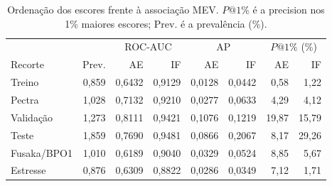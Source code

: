 \begin{table}[htbp]
\centering\small
\caption{Ordenação dos escores frente à associação MEV. $P@1\%$ é a precision nos 1\% maiores escores; Prev. é a prevalência (\%).}
\label{tab:associacao}
\begin{tabular}{@{}lrrrrrrr@{}}
\toprule
 & & \multicolumn{2}{c}{ROC-AUC} & \multicolumn{2}{c}{AP} & \multicolumn{2}{c}{$P@1\%$ (\%)} \\ Recorte & Prev. & AE & IF & AE & IF & AE & IF \\
\midrule
Treino & 0,859 & 0,6432 & 0,9129 & 0,0128 & 0,0442 & 0,58 & 1,22 \\
Pectra & 1,028 & 0,7132 & 0,9210 & 0,0277 & 0,0633 & 4,29 & 4,12 \\
Validação & 1,273 & 0,8111 & 0,9421 & 0,1076 & 0,1219 & 19,87 & 15,79 \\
Teste & 1,859 & 0,7690 & 0,9481 & 0,0866 & 0,2067 & 8,17 & 29,26 \\
Fusaka/BPO1 & 1,010 & 0,6189 & 0,9040 & 0,0329 & 0,0524 & 8,85 & 5,67 \\
Estresse & 0,876 & 0,6309 & 0,8822 & 0,0286 & 0,0349 & 7,12 & 1,71 \\
\bottomrule
\end{tabular}
\end{table}
